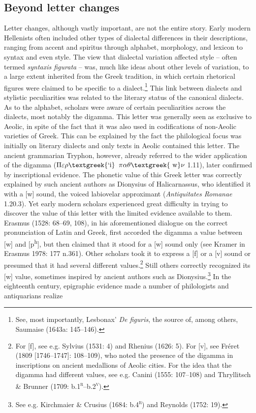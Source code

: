 \subsection{Beyond letter changes}
\hypertarget{Toc19704846}{}\begin{styleCatalogusnotities}
Letter changes, although vastly important, are not the entire story. Early modern Hellenists often included other types of dialectal differences in their descriptions, ranging from accent and spiritus through alphabet, morphology, and lexicon to syntax and even style. The view that dialectal variation affected style – often termed \textit{syntaxis figurata} – was, much like ideas about other levels of variation, to a large extent inherited from the Greek tradition, in which certain rhetorical figures were claimed to be specific to a dialect.\footnote{\textrm{ See, most importantly, Lesbonax’ }\textrm{\textit{De figuris}}\textrm{, the source of, among others, Saumaise (1643a: 145–146).}} This link between dialects and stylistic peculiarities was related to the literary status of the canonical dialects. As to the alphabet, scholars were aware of certain peculiarities across the dialects, most notably the digamma. This letter was generally seen as exclusive to Aeolic, in spite of the fact that it was also used in codifications of non-Aeolic varieties of Greek. This can be explained by the fact the philological focus was initially on literary dialects and only texts in Aeolic contained this letter. The ancient grammarian Tryphon, however, already referred to the wider application of the digamma ($\Pi \varepsilon \rho \text{\textgreek{`i}}$ $\pi \alpha \theta \text{\textgreek{~w}}\nu $ 1.11), later confirmed by inscriptional evidence. The phonetic value of this Greek letter was correctly explained by such ancient authors as Dionysius of Halicarnassus, who identified it with a [w] sound, the voiced labiovelar approximant (\textit{Antiquitates Romanae} 1.20.3). Yet early modern scholars experienced great difficulty in trying to discover the value of this letter with the limited evidence available to them. Erasmus (1528: 68–69, 108), in his aforementioned dialogue on the correct pronunciation of Latin and Greek, first accorded the digamma a value between [w] and [p\textsuperscript{h}], but then claimed that it stood for a [w] sound only (see Kramer in Erasmus 1978: 177 n.361). Other scholars took it to express a [f] or a [v] sound or presumed that it had several different values.\footnote{\textrm{ For [f], see e.g. Sylvius (1531: 4) and Rhenius (1626: 5). For [v], see Fréret (1809 [1746–1747]: 108–109), who noted the presence of the digamma in inscriptions on ancient medallions of Aeolic cities. For the idea that the digamma had different values, see e.g. Canini (1555: 107–108) and Thryllitsch \& Brunner (1709: b.1}\textrm{\textsc{\textsuperscript{r}}}\textrm{–b.2}\textrm{\textsc{\textsuperscript{v}}}\textrm{).}} Still others correctly recognized its [w] value, sometimes inspired by ancient authors such as Dionysius.\footnote{\textrm{ See e.g. Kirchmaier \& Crusius (1684: b.4}\textrm{\textsc{\textsuperscript{r}}}\textrm{\textsc{) }}\textrm{and Reynolds (1752: 19).}} In the eighteenth century, epigraphic evidence made a number of philologists and antiquarians realize 
\end{styleCatalogusnotities}

